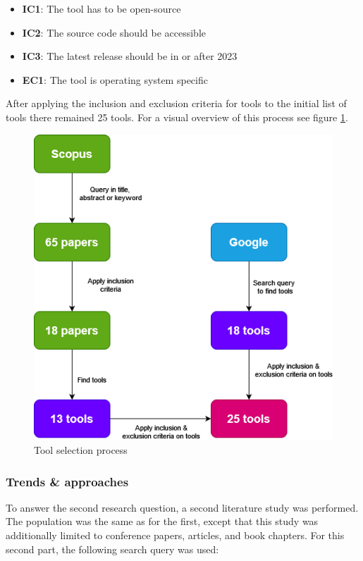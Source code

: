 \documentclass[11pt]{article}
\begin{document}
\begin{itemize}
    \item \textbf{IC1}: The tool has to be open-source
    \item \textbf{IC2}: The source code should be accessible
    \item \textbf{IC3}: The latest release should be in or after 2023
    \item \textbf{EC1}: The tool is operating system specific
\end{itemize}

After applying the inclusion and exclusion criteria for tools to the initial list of tools there remained 25 tools. For a visual overview of this process see figure \ref{fig:tools}.

\begin{figure}
\centering
\includegraphics[scale=0.5]{Images/Tools.drawio.png}
\caption{Tool selection process}
\label{fig:tools}
\end{figure}

\subsubsection{Trends \& approaches}
\label{searchstrat:trends}
To answer the second research question, a second literature study was performed. The population was the same as for the first, except that this study was additionally limited to conference papers, articles, and book chapters. For this second part, the following search query was used:\\
\end{document}
